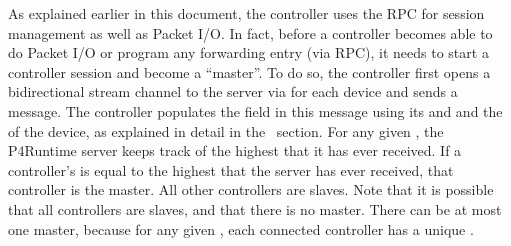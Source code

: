 \documentclass[11pt]{article}
\begin{document}
{%
As explained earlier in this document, the controller uses the 
RPC for session management as well as Packet I/O. In fact, before a controller
becomes able to do Packet I/O or program any forwarding entry (via  RPC),
it needs to start a controller session and become a \textquotedblleft{}master\textquotedblright{}. To do so, the
controller first opens a bidirectional stream channel to the server via
 for each device and sends a  message. The
controller populates the  field in this message using
its  and  and the  of the device, as explained
in detail in the~
section. For any given , the P4Runtime server keeps track
of the highest  that it has ever received. If a controller's
 is equal to the highest  that the server has ever
received, that controller is the master. All other controllers are slaves. Note
that it is possible that all controllers are slaves, and that there is no
master. There can be at most one master, because for any given
, each connected controller has a unique .%

}
\end{document}
